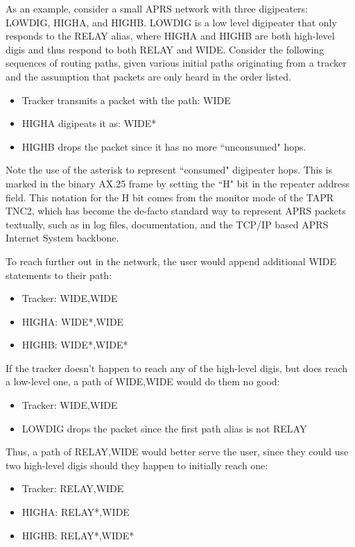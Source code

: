 As an example, consider a small APRS network with three digipeaters: LOWDIG, HIGHA, and HIGHB.
LOWDIG is a low level digipeater that only responds to the RELAY alias, 
where HIGHA and HIGHB are both high-level digis and thus respond to both RELAY and WIDE.
Consider the following sequences of routing paths,
given various initial paths originating from a tracker and the assumption that packets are only
heard in the order listed.
\begin{itemize}
	\item Tracker transmits a packet with the path: WIDE
	\item HIGHA digipeats it as: WIDE*
	\item HIGHB drops the packet since it has no more ``unconsumed" hops.
\end{itemize}

Note the use of the asterisk to represent ``consumed" digipeater hops.
This is marked in the binary AX.25 frame by setting the ``H" bit in the
repeater address field.
This notation for the H bit comes from the monitor mode
of the TAPR TNC2, which has become the de-facto standard way to represent
APRS packets textually, such as in log files, documentation, and the
TCP/IP based APRS Internet System backbone.

To reach further out in the network, the user would append additional WIDE statements to their path:

\begin{itemize}
	\item Tracker: WIDE,WIDE
	\item HIGHA: WIDE*,WIDE
	\item HIGHB: WIDE*,WIDE*
\end{itemize}

If the tracker doesn't happen to reach any of the high-level digis, 
but does reach a low-level one, a path of WIDE,WIDE would do them no good:

\begin{itemize}
	\item Tracker: WIDE,WIDE
	\item LOWDIG drops the packet since the first path alias is not RELAY
\end{itemize}

Thus, a path of RELAY,WIDE would better serve the user,
since they could use two high-level digis should they happen to initially reach one:

\begin{itemize}
	\item Tracker: RELAY,WIDE
	\item HIGHA: RELAY*,WIDE
	\item HIGHB: RELAY*,WIDE*
\end{itemize}

